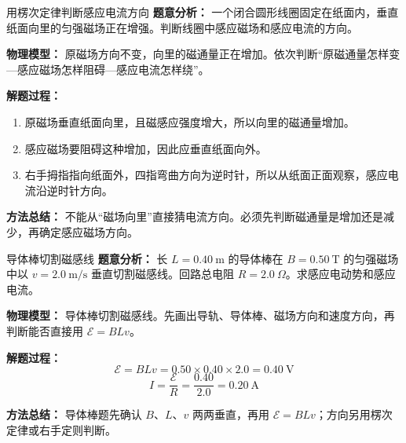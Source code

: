 \begin{examplebox}{用楞次定律判断感应电流方向}
\textbf{题意分析：} 一个闭合圆形线圈固定在纸面内，垂直纸面向里的匀强磁场正在增强。判断线圈中感应磁场和感应电流的方向。

\textbf{物理模型：} 原磁场方向不变，向里的磁通量正在增加。依次判断“原磁通量怎样变—感应磁场怎样阻碍—感应电流怎样绕”。

\begin{center}

\end{center}

\textbf{解题过程：}
\begin{enumerate}
  \item 原磁场垂直纸面向里，且磁感应强度增大，所以向里的磁通量增加。
  \item 感应磁场要阻碍这种增加，因此应垂直纸面向外。
  \item 右手拇指指向纸面外，四指弯曲方向为逆时针，所以从纸面正面观察，感应电流沿逆时针方向。
\end{enumerate}

\textbf{方法总结：} 不能从“磁场向里”直接猜电流方向。必须先判断磁通量是增加还是减少，再确定感应磁场方向。
\end{examplebox}

\begin{examplebox}{导体棒切割磁感线}
\textbf{题意分析：} 长 $L=0.40\ \mathrm{m}$ 的导体棒在 $B=0.50\ \mathrm{T}$ 的匀强磁场中以 $v=2.0\ \mathrm{m/s}$ 垂直切割磁感线。回路总电阻 $R=2.0\ \Omega$。求感应电动势和感应电流。

\textbf{物理模型：} 导体棒切割磁感线。先画出导轨、导体棒、磁场方向和速度方向，再判断能否直接用 $\mathcal E=BLv$。

\begin{center}

\end{center}

\textbf{解题过程：}
\[
\mathcal E=BLv=0.50\times0.40\times2.0=0.40\ \mathrm{V}
\]
\[
I=\frac{\mathcal E}{R}=\frac{0.40}{2.0}=0.20\ \mathrm{A}
\]

\textbf{方法总结：} 导体棒题先确认 $B$、$L$、$v$ 两两垂直，再用 $\mathcal E=BLv$；方向另用楞次定律或右手定则判断。
\end{examplebox}

